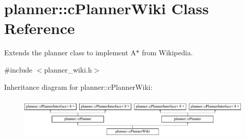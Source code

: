 \hypertarget{classplanner_1_1c_planner_wiki}{}\section{planner\+:\+:c\+Planner\+Wiki Class Reference}
\label{classplanner_1_1c_planner_wiki}


Extends the planner class to implement A$\ast$ from Wikipedia.  




{\ttfamily \#include $<$planner\+\_\+wiki.\+h$>$}

Inheritance diagram for planner\+:\+:c\+Planner\+Wiki\+:\begin{figure}[H]
\begin{center}
\leavevmode
\includegraphics[height=2.089552cm]{classplanner_1_1c_planner_wiki}
\end{center}
\end{figure}
